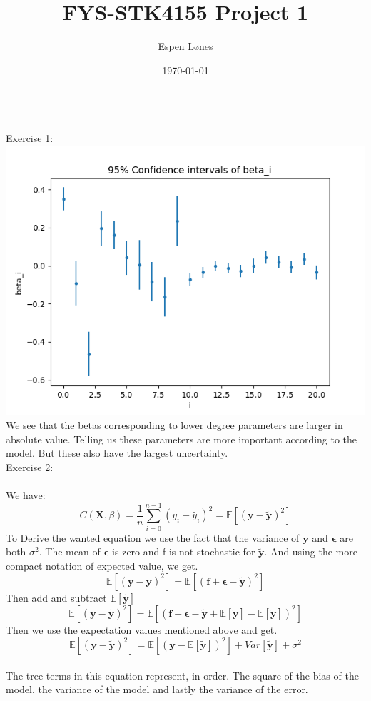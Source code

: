 \documentclass[12pt, letterpaper, twoside]{article}
\begin{document}
\title{FYS-STK4155 Project 1}
\author{Espen Lønes}
\date{\today}
\maketitle
\ \\
Exercise 1:\\
\includegraphics[scale=0.8]{"Confidence_beta.png"}\\
We see that the betas corresponding to lower degree parameters are larger in absolute value. Telling us these parameters are more important according to the model. But these also have the largest uncertainty. 
\newpage
\ \\
Exercise 2:\\
\ \\
We have:
$$
C(\mathbf{X}, \beta) = \frac{1}{n} \sum_{i=0}^{n-1} (y_i - \tilde{y_i})^2
= \mathbb{E}[(\mathbf{y} - \mathbf{\tilde{y}})^2]
$$
To Derive the wanted equation we use the fact that the variance of $\mathbf{y}$ and $\mathbf{\epsilon}$ are both $\sigma^2$. The mean of $\mathbf{\epsilon}$ is zero and f is not stochastic for $\mathbf{\tilde{y}}$. And using the more compact notation of expected value, we get.
$$
\mathbb{E}[(\mathbf{y} - \mathbf{\tilde{y}})^2]
=
\mathbb{E}[(\mathbf{f} + \mathbf{\epsilon} - \mathbf{\tilde{y}})^2]
$$
Then add and subtract $\mathbb{E}[\mathbf{\tilde{y}}]$
$$
\mathbb{E}[(\mathbf{y} - \mathbf{\tilde{y}})^2]
=
\mathbb{E}[(\mathbf{f} + \mathbf{\epsilon} - \mathbf{\tilde{y}} + \mathbb{E}[\mathbf{\tilde{y}}] - \mathbb{E}[\mathbf{\tilde{y}}])^2]
$$
Then we use the expectation values mentioned above and get.
$$
\mathbb{E}[(\mathbf{y} - \mathbf{\tilde{y}})^2]
=
\mathbb{E}[(\mathbf{y} - \mathbb{E}[\mathbf{\tilde{y}}])^2]
+ Var[\mathbf{\tilde{y}}]
+ \sigma^2
$$
\ \\
The tree terms in this equation represent, in order. The square of the bias of the model, the variance of the model and lastly the variance of the error.   
\end{document}
